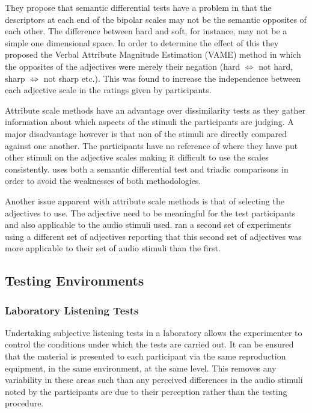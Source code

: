 			They propose that semantic differential tests have a problem in that the descriptors at each end of
			the bipolar scales may not be the semantic opposites of each other. The difference between hard and
			soft, for instance, may not be a simple one dimensional space. In order to determine the effect of
			this they proposed the Verbal Attribute Magnitude Estimation (VAME) method in which the opposites
			of the adjectives were merely their negation (hard $\Leftrightarrow$ not hard, sharp
			$\Leftrightarrow$ not sharp etc.). This was found to increase the independence between each
			adjective scale in the ratings given by participants. 

			Attribute scale methods have an advantage over dissimilarity tests as they gather information about
			which aspects of the stimuli the participants are judging. A major disadvantage however is that non
			of the stimuli are directly compared against one another. The participants have no reference of
			where they have put other stimuli on the adjective scales making it difficult to use the scales
			consistently. \citet{marui2005constructing} uses both a semantic differential test and triadic
			comparisons in order to avoid the weaknesses of both methodologies. 
			
			Another issue apparent with attribute scale methods is that of selecting the adjectives to use. The
			adjective need to be meaningful for the test participants and also applicable to the audio stimuli
			used. \citet{kendall1993verbal2} ran a second set of experiments using a different set of
			adjectives reporting that this second set of adjectives was more applicable to their set of audio
			stimuli than the first.

	\subsection{Testing Environments}
	\label{sec:Timbre-ListeningTests-Environments}

		\subsubsection*{Laboratory Listening Tests}
			Undertaking subjective listening tests in a laboratory allows the experimenter to control the
			conditions under which the tests are carried out. It can be ensured that the material is presented
			to each participant via the same reproduction equipment, in the same environment, at the same
			level.  This removes any variability in these areas such than any perceived differences in the
			audio stimuli noted by the participants are due to their perception rather than the testing
			procedure.

